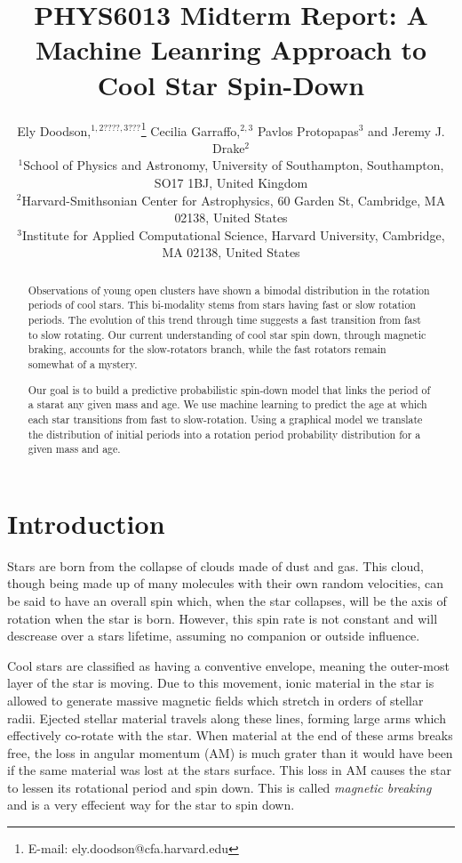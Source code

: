 \documentclass[fleqn,usenatbib]{mnras}
\title{PHYS6013 Midterm Report: A Machine Leanring Approach to Cool Star Spin-Down}
\author[E. Doodson et al.]{
Ely Doodson,$^{1,2????,3???}$\thanks{E-mail: ely.doodson@cfa.harvard.edu}
Cecilia Garraffo,$^{2,3}$
Pavlos Protopapas$^{3}$
and Jeremy J. Drake$^{2}$
\\
$^{1}$School of Physics and Astronomy, University of Southampton,
Southampton, SO17 1BJ, United Kingdom\\
$^{2}$Harvard-Smithsonian Center for Astrophysics, 60 Garden St, Cambridge, MA 02138, United States \\
$^{3}$Institute for Applied Computational Science, Harvard University, Cambridge, MA 02138, United States
}
\begin{document}
\label{firstpage}
\pagerange{\pageref{firstpage}--\pageref{lastpage}}
\maketitle

\begin{abstract}
	Observations of young open clusters have shown a bimodal distribution in the rotation
	periods of cool stars.
	This bi-modality stems from stars having fast or slow rotation periods.
	The evolution of this trend through time suggests a fast transition from fast to slow rotating.
	Our current understanding of cool star spin down, through magnetic braking, accounts for the slow-rotators branch, while the fast rotators remain somewhat of a mystery.

	Our goal is to build a predictive probabilistic spin-down model that links the period of a starat any given mass and age.
	We use machine learning to predict the age at which each star transitions from fast to slow-rotation.
	Using a graphical model we translate the distribution of initial periods into a rotation period probability distribution for a given mass and age.
\end{abstract}


\section{Introduction}
Stars are born from the collapse of clouds made of dust and gas.
This cloud, though being made up of many molecules with their own random velocities, can be said to have an overall spin which, when the star collapses, will be the axis of rotation when the star is born.
However, this spin rate is not constant and will descrease over a stars lifetime, assuming no companion or outside influence.

Cool stars are classified as having a conventive envelope, meaning the outer-most layer of the star is moving.
Due to this movement, ionic material in the star is allowed to generate massive magnetic fields which stretch in orders of stellar radii.
Ejected stellar material travels along these lines, forming large arms which effectively co-rotate with the star.
When material at the end of these arms breaks free, the loss in angular momentum (AM) is much grater than it would have been if the same material was lost at the stars surface.
This loss in AM causes the star to lessen its rotational period and spin down.
This is called \emph{magnetic breaking} and is a very effecient way for the star to spin down.
\end{document}

